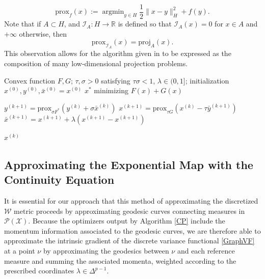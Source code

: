 \documentclass{article}
\DeclareMathOperator*{\argmin}{argmin}
\newcommand{\R}{\mathbb{R}}
\newcommand{\W}{\mathcal{W}}
\newcommand{\X}{\mathcal{X}}
\newcommand{\prox}{\text{prox}}
\newcommand{\proj}{\text{proj}}
\begin{document}
\begin{equation*}
  \prox_f(x) := \argmin_{y \in H} \frac{1}{2}\|x - y\|_{H}^2 + f(y).
\end{equation*}
Note that if \(A \subset H\), and \(\mathcal{I}_A: H \to \R\) is defined so that \(\mathcal{I}_A(x) = 0\) for \(x \in A\) and \(+\infty\) otherwise, then 
\begin{equation*}
  \prox_{\mathcal{I}_A}(x) = \proj_A(x).
\end{equation*}
This observation allows for the algorithm given in \cite{erbarComputationOptimalTransport2020} to be expressed as the composition of many low-dimensional projection problems.

\begin{algorithm}
  \caption{Generic Chambolle-Pock Routine}
  \label{CP}
  \begin{algorithmic}
    \Require Convex function \(F, G\); \(\tau,\sigma > 0\) satisfying \(\tau\sigma < 1\), \(\lambda \in (0,1]\); initialization \(x^{(0)}, y^{(0)}, \bar{x}^{(0)}=x^{(0)}\)
    \Ensure \(x^*\) minimizing \(F(x) + G(x)\) 

      \State \(y^{(k+1)} = \prox_{\sigma F^{*}}(y^{(k)} + \sigma \bar{x}^{(k)})\)
      \State \(x^{(k+1)} = \prox_{\tau G}(x^{(k)} - \tau \bar{y}^{(k+1)})\)
      \State \(\bar{x}^{(k+1)} = x^{(k+1)} + \lambda (x^{(k+1)} - {x}^{(k+1)})\)

    \EndWhile

    \State \Return \(x^{(k)}\)
	
  \end{algorithmic}
  
\end{algorithm}
\subsection{Approximating the Exponential Map with the Continuity Equation}
It is essential for our approach that this method of approximating the discretized \(\W\) metric proceeds by approximating geodesic curves connecting measures in \(\mathcal{P}(\X)\). Because the optimizers output by Algorithm \eqref{CP} include the momentum information associated to the geodesic curves, we are therefore able to approximate the intrinsic gradient of the discrete variance functional \eqref{GraphVF} at a point \(\nu\) by approximating the geodesics between \(\nu\) and each reference measure and summing the associated momenta, weighted according to the prescribed coordinates \(\lambda \in\Delta^{p-1}\).
\end{document}
